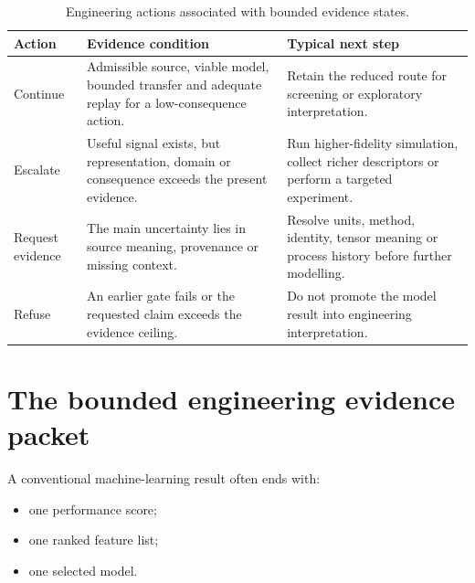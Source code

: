 \documentclass[11pt,a4paper,oneside]{report}
\begin{document}
\begin{table}[H]



\centering



\caption{Engineering actions associated with bounded evidence states.}



\label{tab:engineering-actions}



\begin{tabularx}{\textwidth}{L{0.18\textwidth}
    Y
    Y
}
\toprule
\textbf{Action}
&
\textbf{Evidence condition}
&
\textbf{Typical next step}
\\
\midrule
Continue
&
Admissible source,
viable model,
bounded transfer
and adequate replay for a low-consequence action.
&
Retain the reduced route for screening or exploratory interpretation.
\\
\addlinespace
Escalate
&
Useful signal exists,
but representation,
domain
or consequence exceeds the present evidence.
&
Run higher-fidelity simulation,
collect richer descriptors
or perform a targeted experiment.
\\
\addlinespace
Request evidence
&
The main uncertainty lies in source meaning,
provenance
or missing context.
&
Resolve units,
method,
identity,
tensor meaning
or process history before further modelling.
\\
\addlinespace
Refuse
&
An earlier gate fails or the requested claim exceeds the evidence
ceiling.
&
Do not promote the model result into engineering interpretation.
\\
\bottomrule
\end{tabularx}



\end{table}





\section{The bounded engineering evidence packet}



A conventional machine-learning result often ends with:



\begin{itemize}



\item

one performance score;



\item

one ranked feature list;



\item

one selected model.



\end{itemize}
\end{document}
